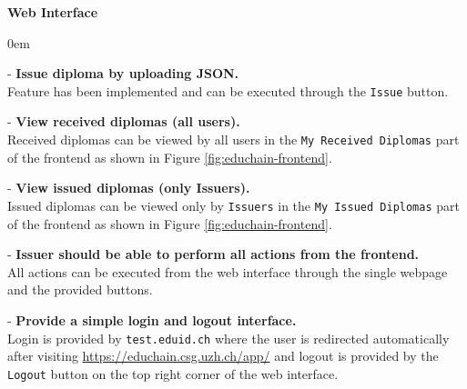 %	
\textbf{Web Interface}
\begin{description}[leftmargin=15pt]
	\itemsep0em	
	\item - \textbf{Issue diploma by uploading JSON.} \hfill \\
	Feature has been implemented and can be executed through the \texttt{Issue} button.
	\item - \textbf{View received diplomas (all users).} \hfill \\
	Received diplomas can be viewed by all users in the \texttt{My Received Diplomas} part of the frontend as shown in Figure \ref{fig:educhain-frontend}.
	\item - \textbf{View issued diplomas (only Issuers).} \hfill \\
	Issued diplomas can be viewed only by \texttt{Issuers} in the \texttt{My Issued Diplomas} part of the frontend as shown in Figure \ref{fig:educhain-frontend}.
	\item - \textbf{Issuer should be able to perform all actions from the frontend.} \hfill \\
	All actions can be executed from the web interface through the single webpage and the provided buttons. 
	\item - \textbf{Provide a simple login and logout interface.} \hfill \\
	Login is provided by \texttt{test.eduid.ch} where the user is redirected automatically after visiting \url{https://educhain.csg.uzh.ch/app/} and logout is provided by the \texttt{Logout} button on the top right corner of the web interface.
\end{description}
